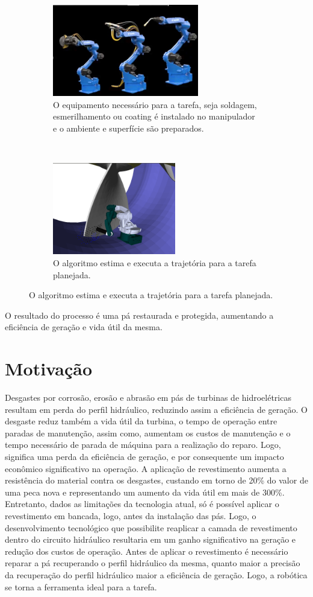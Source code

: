\begin{figure}[H]
\ContinuedFloat
\begin{subfigure}{0.5\textwidth}
\includegraphics[width=0.9\linewidth, height=4cm]{figs/robots_evo} 
\caption{O equipamento necessário para a tarefa, seja soldagem, esmerilhamento
ou coating é instalado no manipulador e o ambiente e superfície são preparados.}
\end{subfigure}
~
\begin{subfigure}{0.5\textwidth}
\label{fig:subim2}
\includegraphics[width=0.9\linewidth, height=4cm]{figs/footleft}
\caption{O algoritmo estima e executa a trajetória para a tarefa planejada.}
\end{subfigure}
 \label{fig:image2}
\end{figure}

O resultado do processo é uma pá restaurada e protegida, aumentando a eficiência
de geração e vida útil da mesma. 

\section{Motivação}

Desgastes por corrosão, erosão e abrasão em pás de turbinas de hidroelétricas
resultam em perda do perfil hidráulico, reduzindo assim a eficiência de geração.
O desgaste reduz também a vida útil da turbina, o tempo de operação entre
paradas de manutenção, assim como, aumentam os custos de manutenção e o tempo
necessário de parada de máquina para a realização do reparo. Logo, significa uma
perda da eficiência de geração, e por consequente um impacto econômico
significativo na operação.
A aplicação de revestimento aumenta a resistência do material contra os
desgastes, custando em torno de 20\% do valor de uma peca nova e representando
um aumento da vida útil em mais de 300\%. Entretanto, dados as limitações da
tecnologia atual, só é possível aplicar o revestimento em bancada, logo, antes
da instalação das pás. Logo, o desenvolvimento tecnológico que possibilite
reaplicar a camada de revestimento dentro do circuito hidráulico resultaria em
um ganho significativo na geração e redução dos custos de operação.
Antes de aplicar o revestimento é necessário reparar a pá recuperando o perfil
hidráulico da mesma, quanto maior a precisão da recuperação do perfil hidráulico
maior a eficiência de geração. Logo, a robótica se torna a ferramenta ideal para a tarefa.

